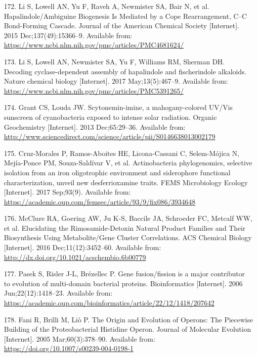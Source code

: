 \documentclass[12pt,twoside]{reedthesis}
\begin{document}
  \hypertarget{ref-li_hapalindole_ambiguine_2015}{}
  172. Li S, Lowell AN, Yu F, Raveh A, Newmister SA, Bair N, et al.
  Hapalindole/Ambiguine Biogenesis Is Mediated by a Cope Rearrangement,
  C--C Bond-Forming Cascade. Journal of the American Chemical Society
  {[}Internet{]}. 2015 Dec;137(49):15366--9. Available from:
  \url{https://www.ncbi.nlm.nih.gov/pmc/articles/PMC4681624/}
  
  \hypertarget{ref-li_decoding_2017}{}
  173. Li S, Lowell AN, Newmister SA, Yu F, Williams RM, Sherman DH.
  Decoding cyclase-dependent assembly of hapalindole and fischerindole
  alkaloids. Nature chemical biology {[}Internet{]}. 2017
  May;13(5):467--9. Available from:
  \url{https://www.ncbi.nlm.nih.gov/pmc/articles/PMC5391265/}
  
  \hypertarget{ref-grant_scytonemin-imine_2013}{}
  174. Grant CS, Louda JW. Scytonemin-imine, a mahogany-colored UV/Vis
  sunscreen of cyanobacteria exposed to intense solar radiation. Organic
  Geochemistry {[}Internet{]}. 2013 Dec;65:29--36. Available from:
  \url{http://www.sciencedirect.com/science/article/pii/S0146638013002179}
  
  \hypertarget{ref-cruz-morales_actinobacteria_2017}{}
  175. Cruz-Morales P, Ramos-Aboites HE, Licona-Cassani C, Selem-Mójica N,
  Mejía-Ponce PM, Souza-Saldívar V, et al. Actinobacteria phylogenomics,
  selective isolation from an iron oligotrophic environment and
  siderophore functional characterization, unveil new desferrioxamine
  traits. FEMS Microbiology Ecology {[}Internet{]}. 2017 Sep;93(9).
  Available from:
  \url{https://academic.oup.com/femsec/article/93/9/fix086/3934648}
  
  \hypertarget{ref-mcclure_elucidating_2016}{}
  176. McClure RA, Goering AW, Ju K-S, Baccile JA, Schroeder FC, Metcalf
  WW, et al. Elucidating the Rimosamide-Detoxin Natural Product Families
  and Their Biosynthesis Using Metabolite/Gene Cluster Correlations. ACS
  Chemical Biology {[}Internet{]}. 2016 Dec;11(12):3452--60. Available
  from: \url{http://dx.doi.org/10.1021/acschembio.6b00779}
  
  \hypertarget{ref-pasek_gene_2006}{}
  177. Pasek S, Risler J-L, Brézellec P. Gene fusion/fission is a major
  contributor to evolution of multi-domain bacterial proteins.
  Bioinformatics {[}Internet{]}. 2006 Jun;22(12):1418--23. Available from:
  \url{https://academic.oup.com/bioinformatics/article/22/12/1418/207642}
  
  \hypertarget{ref-fani_origin_2005}{}
  178. Fani R, Brilli M, Liò P. The Origin and Evolution of Operons: The
  Piecewise Building of the Proteobacterial Histidine Operon. Journal of
  Molecular Evolution {[}Internet{]}. 2005 Mar;60(3):378--90. Available
  from: \url{https://doi.org/10.1007/s00239-004-0198-1}
  
\end{document}

